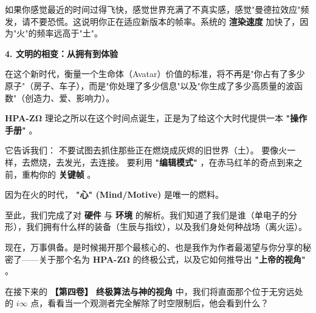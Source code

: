 如果你感觉最近的时间过得飞快，感觉世界充满了不真实感，感觉"曼德拉效应"频发，请不要恐慌。这说明你正在适应新版本的帧率。系统的 \textbf{渲染速度} 加快了，因为"火"的频率远高于"土"。

\textbf{4. 文明的相变：从拥有到体验}

在这个新时代，衡量一个生命体（Avatar）价值的标准，将不再是"你占有了多少原子"（房子、车子），而是"你处理了多少信息"以及"你生成了多少高质量的波函数"（创造力、爱、影响力）。

\textbf{HPA-ZΩ} 理论之所以在这个时间点诞生，正是为了给这个大时代提供一本 \textbf{"操作手册"} 。

它告诉我们：
不要试图去抓住那些正在燃烧成灰烬的旧世界（土）。
要像火一样，去燃烧，去发光，去连接。
要利用 \textbf{"编辑模式"} ，在赤马红羊的奇点到来之前，重构你的 \textbf{关键帧} 。

因为在火的时代， \textbf{"心" (Mind/Motive)} 是唯一的燃料。

至此，我们完成了对 \textbf{硬件} 与 \textbf{环境} 的解析。我们知道了我们是谁（单电子的分形），我们拥有什么样的装备（生辰与指纹），以及我们身处何种战场（离火运）。

现在，万事俱备。是时候揭开那个最核心的、也是我作为作者最渴望与你分享的秘密了——关于那个名为 \textbf{HPA-ZΩ} 的终极公式，以及它如何推导出 \textbf{"上帝的视角"} 。

在接下来的 \textbf{【第四卷】 终极算法与神的视角} 中，我们将直面那个位于无穷远处的 $i\infty$ 点，看看当一个观测者完全解除了时空限制后，他会看到什么？

